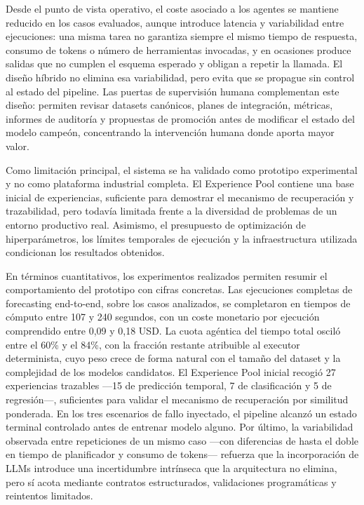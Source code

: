 \documentclass[12pt,a4paper]{article}
\theoremstyle{plain}
\begin{document}
Desde el punto de vista operativo, el coste asociado a los agentes se mantiene reducido en los casos evaluados, aunque introduce latencia y variabilidad entre ejecuciones: una misma tarea no garantiza siempre el mismo tiempo de respuesta, consumo de tokens o número de herramientas invocadas, y en ocasiones produce salidas que no cumplen el esquema esperado y obligan a repetir la llamada. El diseño híbrido no elimina esa variabilidad, pero evita que se propague sin control al estado del pipeline. Las puertas de supervisión humana complementan este diseño: permiten revisar datasets canónicos, planes de integración, métricas, informes de auditoría y propuestas de promoción antes de modificar el estado del modelo campeón, concentrando la intervención humana donde aporta mayor valor.

Como limitación principal, el sistema se ha validado como prototipo experimental y no como plataforma industrial completa. El Experience Pool contiene una base inicial de experiencias, suficiente para demostrar el mecanismo de recuperación y trazabilidad, pero todavía limitada frente a la diversidad de problemas de un entorno productivo real. Asimismo, el presupuesto de optimización de hiperparámetros, los límites temporales de ejecución y la infraestructura utilizada condicionan los resultados obtenidos.

En términos cuantitativos, los experimentos realizados permiten resumir el comportamiento del prototipo con cifras concretas. Las ejecuciones completas de forecasting end-to-end, sobre los casos analizados, se completaron en tiempos de cómputo entre 107 y 240 segundos, con un coste monetario por ejecución comprendido entre 0,09 y 0,18 USD. La cuota agéntica del tiempo total osciló entre el 60\% y el 84\%, con la fracción restante atribuible al executor determinista, cuyo peso crece de forma natural con el tamaño del dataset y la complejidad de los modelos candidatos. El Experience Pool inicial recogió 27 experiencias trazables ---15 de predicción temporal, 7 de clasificación y 5 de regresión---, suficientes para validar el mecanismo de recuperación por similitud ponderada. En los tres escenarios de fallo inyectado, el pipeline alcanzó un estado terminal controlado antes de entrenar modelo alguno. Por último, la variabilidad observada entre repeticiones de un mismo caso ---con diferencias de hasta el doble en tiempo de planificador y consumo de tokens--- refuerza que la incorporación de LLMs introduce una incertidumbre intrínseca que la arquitectura no elimina, pero sí acota mediante contratos estructurados, validaciones programáticas y reintentos limitados.
\end{document}
